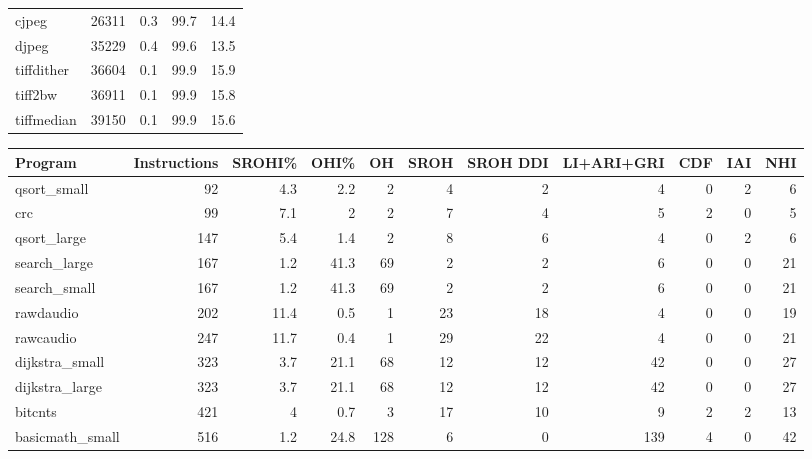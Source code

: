 \begin{tabular}{lrrrr}
 cjpeg           &   26311 &    0.3 &         99.7 &    14.4 \\
 djpeg           &   35229 &    0.4 &         99.6 &    13.5 \\
 tiffdither      &   36604 &    0.1 &         99.9 &    15.9 \\
 tiff2bw         &   36911 &    0.1 &         99.9 &    15.8 \\
 tiffmedian      &   39150 &    0.1 &         99.9 &    15.6 \\
\hline
\end{tabular}\begin{tabular}{lrrrrrrrrrr}
\hline
 Program         &   Instructions &   SROHI\% &   OHI\% &   OH &   SROH &   SROH DDI &   LI+ARI+GRI &   CDF &   IAI &   NHI \\
\hline
 qsort\_small     &             92 &      4.3 &    2.2 &    2 &      4 &          2 &            4 &     0 &     2 &     6 \\
 crc             &             99 &      7.1 &    2   &    2 &      7 &          4 &            5 &     2 &     0 &     5 \\
 qsort\_large     &            147 &      5.4 &    1.4 &    2 &      8 &          6 &            4 &     0 &     2 &     6 \\
 search\_large    &            167 &      1.2 &   41.3 &   69 &      2 &          2 &            6 &     0 &     0 &    21 \\
 search\_small    &            167 &      1.2 &   41.3 &   69 &      2 &          2 &            6 &     0 &     0 &    21 \\
 rawdaudio       &            202 &     11.4 &    0.5 &    1 &     23 &         18 &            4 &     0 &     0 &    19 \\
 rawcaudio       &            247 &     11.7 &    0.4 &    1 &     29 &         22 &            4 &     0 &     0 &    21 \\
 dijkstra\_small  &            323 &      3.7 &   21.1 &   68 &     12 &         12 &           42 &     0 &     0 &    27 \\
 dijkstra\_large  &            323 &      3.7 &   21.1 &   68 &     12 &         12 &           42 &     0 &     0 &    27 \\
 bitcnts         &            421 &      4   &    0.7 &    3 &     17 &         10 &            9 &     2 &     2 &    13 \\
 basicmath\_small &            516 &      1.2 &   24.8 &  128 &      6 &          0 &          139 &     4 &     0 &    42 \\

\end{tabular}

